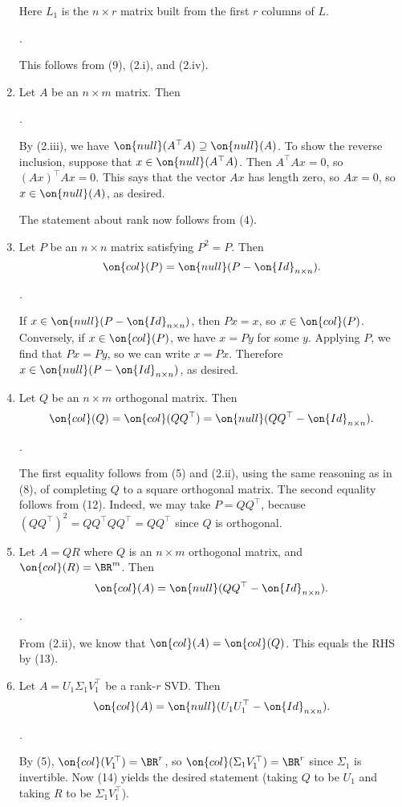 \documentclass[10pt]{amsart}
\makeatletter
\renewenvironment{proof}[1][\proofname]{\par
	\pushQED{\qed}%
	\normalfont \topsep6\p@\@plus6\p@\relax
	\noindent\emph{#1.} 
	\ignorespaces
}{%
\popQED\endtrivlist\@endpefalse
}
\theoremstyle{mythm}
\theoremstyle{definition}
\theoremstyle{myrmk}
\newenvironment{myproof}{\color{blue}\begin{proof}}{\end{proof}}
\makeatother
\begin{document}
\begin{enumerate}[label=(\arabic*)]
{		} 
		Here $L_1$ is the $n \times r$ matrix built from the first $r$ columns of $L$. 
		\begin{myproof}
			This follows from (9), (2.i), and (2.iv). 
		\end{myproof}
		\item Let $A$ be an $n \times m$ matrix. Then 
		\begin{myproof}
			By (2.iii), we have $\on{null}(A^\top A) \supseteq \on{null}(A)$. To show the reverse inclusion, suppose that $x \in \on{null}(A^\top A)$. Then $A^\top Ax = 0$, so $(Ax)^\top Ax =0$. This says that the vector $Ax$ has length zero, so $Ax = 0$, so $x \in \on{null}(A)$, as desired. 
			
			The statement about rank now follows from (4). 
		\end{myproof}
		\item Let $P$ be an $n \times n$ matrix satisfying $P^2 = P$. Then 
		\[
			\on{col}(P) = \on{null}(P - \on{Id}_{n \times n}). 
		\]
		\begin{myproof}
			If $x \in \on{null}(P - \on{Id}_{n \times n})$, then $Px = x$, so $x \in \on{col}(P)$. Conversely, if $x \in \on{col}(P)$, we have $x = Py$ for some $y$. Applying $P$, we find that $Px = Py$, so we can write $x = Px$. Therefore $x \in \on{null}(P - \on{Id}_{n \times n})$, as desired. 
		\end{myproof}
		\item Let $Q$ be an $n \times m$ orthogonal matrix. Then 
		\[
			\on{col}(Q) = \on{col}(QQ^\top) = \on{null}(Q Q^\top - \on{Id}_{n \times n}). 
		\]
		\begin{myproof}
			The first equality follows from (5) and (2.ii), using the same reasoning as in (8), of completing $Q$ to a square orthogonal matrix. The second equality follows from (12). Indeed, we may take $P = QQ^\top$, because $(QQ^\top)^2 = QQ^\top QQ^\top = QQ^\top$ since $Q$ is orthogonal. 
		\end{myproof}
		\item Let $A = QR$ where $Q$ is an $n \times m$ orthogonal matrix, and $\on{col}(R) = \BR^m$. Then 
		\[
			\on{col}(A) = \on{null}(QQ^\top - \on{Id}_{n \times n}). 
		\]
		\begin{myproof}
			From (2.ii), we know that $\on{col}(A) = \on{col}(Q)$. This equals the RHS by (13). 
		\end{myproof}
		\item Let $A = U_1\Sigma_1 V_1^\top$ be a rank-$r$ SVD. Then 
		\[
			\on{col}(A) = \on{null}(U_1 U_1^\top - \on{Id}_{n \times n}). 
		\]
		\begin{myproof}
			By (5), $\on{col}(V_1^\top) = \BR^r$, so $\on{col}(\Sigma_1 V_1^\top) = \BR^r$ since $\Sigma_1$ is invertible. Now (14) yields the desired statement (taking $Q$ to be $U_1$ and taking $R$ to be $\Sigma_1 V_1^\top$). 
		\end{myproof}
	\end{enumerate}
	
\end{document}
